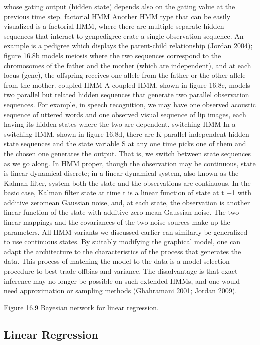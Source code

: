 whose gating output (hidden state) depends also on the gating value at the previous time step. factorial HMM Another HMM type that can be easily visualized is a factorial HMM, where there are multiple separate hidden sequences that interact to genpedigree erate a single observation sequence. An example is a pedigree which displays the parent-child relationship (Jordan 2004); figure 16.8b models meiosis where the two sequences correspond to the chromosomes of the father and the mother (which are independent), and at each locus (gene), the offspring receives one allele from the father or the other allele from the mother. coupled HMM A coupled HMM, shown in figure 16.8c, models two parallel but related hidden sequences that generate two parallel observation sequences. For example, in speech recognition, we may have one observed acoustic sequence of uttered words and one observed visual sequence of lip images, each having its hidden states where the two are dependent. switching HMM In a switching HMM, shown in figure 16.8d, there are K parallel independent hidden state sequences and the state variable S at any one time picks one of them and the chosen one generates the output. That is, we switch between state sequences as we go along. In HMM proper, though the observation may be continuous, state is linear dynamical discrete; in a linear dynamical system, also known as the Kalman filter, system both the state and the observations are continuous. In the basic case, Kalman filter state at time t is a linear function of state at t $-$1 with additive zeromean Gaussian noise, and, at each state, the observation is another linear function of the state with additive zero-mean Gaussian noise. The two linear mappings and the covariances of the two noise sources make up the parameters. All HMM variants we discussed earlier can similarly be generalized to use continuous states. By suitably modifying the graphical model, one can adapt the architecture to the characteristics of the process that generates the data. This process of matching the model to the data is a model selection procedure to best trade offbias and variance. The disadvantage is that exact inference may no longer be possible on such extended HMMs, and one would need approximation or sampling methods (Ghahramani 2001; Jordan 2009).

Figure 16.9 Bayesian network for linear regression.

\subsection{Linear Regression}

